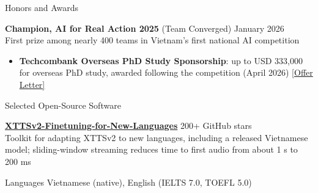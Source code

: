 \documentclass{resume}
\begin{document}
\begin{rSection}{Honors and Awards}

\textbf{Champion, AI for Real Action 2025} (Team Converged) \hfill January 2026\\
First prize among nearly 400 teams in Vietnam's first national AI competition
\begin{itemize}[leftmargin=1.5em,itemsep=0em,topsep=0.1em]
    \item \textbf{Techcombank Overseas PhD Study Sponsorship}: up to USD 333,000
    for overseas PhD study, awarded following the competition (April 2026)
    \href{https://anhnh2002.github.io/Letter_of_Offer_N.H.Anh.pdf}{[Offer Letter]}
\end{itemize}

\end{rSection}

\begin{rSection}{Selected Open-Source Software}

\textbf{\href{https://github.com/anhnh2002/XTTSv2-Finetuning-for-New-Languages}
{XTTSv2-Finetuning-for-New-Languages}} \hfill 200+ GitHub stars\\
Toolkit for adapting XTTSv2 to new languages, including a released Vietnamese model;
sliding-window streaming reduces time to first audio from about 1 s to 200 ms

\end{rSection}

\begin{rSection}{Languages}
Vietnamese (native), English (IELTS 7.0, TOEFL 5.0)
\end{rSection}
\end{document}
